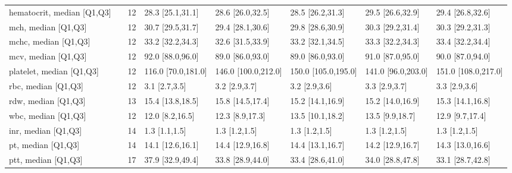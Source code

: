 \begin{tabular}{llllllll}
hematocrit, median [Q1,Q3] &                                   &              12 &          28.3 [25.1,31.1] &          28.6 [26.0,32.5] &         28.5 [26.2,31.3] &          29.5 [26.6,32.9] &         29.4 [26.8,32.6] \\
mch, median [Q1,Q3] &                                   &              12 &          30.7 [29.5,31.7] &          29.4 [28.1,30.6] &         29.8 [28.6,30.9] &          30.3 [29.2,31.4] &         30.3 [29.2,31.3] \\
mchc, median [Q1,Q3] &                                   &              12 &          33.2 [32.2,34.3] &          32.6 [31.5,33.9] &         33.2 [32.1,34.5] &          33.3 [32.2,34.3] &         33.4 [32.2,34.4] \\
mcv, median [Q1,Q3] &                                   &              12 &          92.0 [88.0,96.0] &          89.0 [86.0,93.0] &         89.0 [86.0,93.0] &          91.0 [87.0,95.0] &         90.0 [87.0,94.0] \\
platelet, median [Q1,Q3] &                                   &              12 &        116.0 [70.0,181.0] &       146.0 [100.0,212.0] &      150.0 [105.0,195.0] &        141.0 [96.0,203.0] &      151.0 [108.0,217.0] \\
rbc, median [Q1,Q3] &                                   &              12 &             3.1 [2.7,3.5] &             3.2 [2.9,3.7] &            3.2 [2.9,3.6] &             3.3 [2.9,3.7] &            3.3 [2.9,3.6] \\
rdw, median [Q1,Q3] &                                   &              13 &          15.4 [13.8,18.5] &          15.8 [14.5,17.4] &         15.2 [14.1,16.9] &          15.2 [14.0,16.9] &         15.3 [14.1,16.8] \\
wbc, median [Q1,Q3] &                                   &              12 &           12.0 [8.2,16.5] &           12.3 [8.9,17.3] &         13.5 [10.1,18.2] &           13.5 [9.9,18.7] &          12.9 [9.7,17.4] \\
inr, median [Q1,Q3] &                                   &              14 &             1.3 [1.1,1.5] &             1.3 [1.2,1.5] &            1.3 [1.2,1.5] &             1.3 [1.2,1.5] &            1.3 [1.2,1.5] \\
pt, median [Q1,Q3] &                                   &              14 &          14.1 [12.6,16.1] &          14.4 [12.9,16.8] &         14.4 [13.1,16.7] &          14.2 [12.9,16.7] &         14.3 [13.0,16.6] \\
ptt, median [Q1,Q3] &                                   &              17 &          37.9 [32.9,49.4] &          33.8 [28.9,44.0] &         33.4 [28.6,41.0] &          34.0 [28.8,47.8] &         33.1 [28.7,42.8] \\

\end{tabular}

